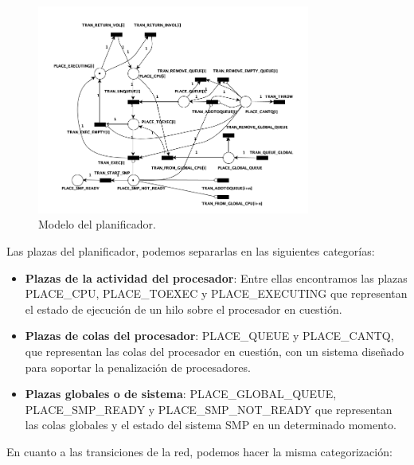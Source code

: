 \begin{figure}[H]
    \centering
    \includegraphics[width=0.8\textwidth]{images/Resource_1CPU.png}
    \caption{Modelo del planificador.}
    \label{fig:schedulerModel}
\end{figure}

Las plazas del planificador, podemos separarlas en las siguientes categorías:

\begin{itemize}
    \item \textbf{Plazas de la actividad del procesador}: Entre ellas encontramos las plazas PLACE\_CPU, PLACE\_TOEXEC y PLACE\_EXECUTING que representan el estado de ejecución de un hilo sobre el procesador en cuestión.
    \item \textbf{Plazas de colas del procesador}: PLACE\_QUEUE y PLACE\_CANTQ, que representan las colas del procesador en cuestión, con un sistema diseñado para soportar la penalización de procesadores.
    \item \textbf{Plazas globales o de sistema}: PLACE\_GLOBAL\_QUEUE, PLACE\_SMP\_READY y PLACE\_SMP\_NOT\_READY que representan las colas globales y el estado del sistema SMP en un determinado momento.
\end{itemize}

En cuanto a las transiciones de la red, podemos hacer la misma categorización:

